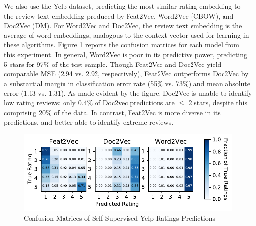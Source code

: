 \documentclass{article}
\begin{document}
We also use the Yelp dataset, predicting the most similar rating embedding to the review text embedding produced by Feat2Vec, Word2Vec (CBOW), and Doc2Vec (DM).
For Word2Vec and Doc2Vec, the review text embedding is the average of word embeddings, analogous to the context vector used for learning in these algorithms. Figure \ref{fig:confmat} reports the confusion matrices for each model from this experiment.
In general, Word2Vec is poor in its predictive power, predicting 5 stars for 97\% of the test sample. Though Feat2Vec and Doc2Vec yield comparable MSE (2.94 vs. 2.92, respectively), Feat2Vec outperforms Doc2Vec by a substantial margin in classification error rate (55\% vs. 73\%) and mean absolute error (1.13 vs. 1.31). As made evident by the figure, Doc2Vec is unable to identify low rating reviews: only 0.4\% of Doc2vec predictions are $\leq$ 2 stars, despite this comprising 20\% of the data. In contrast, Feat2Vec is more diverse in its predictions, and better able to identify extreme reviews.

\begin{figure}
\includegraphics[width=.5\textwidth]{../paper/output/yelp/text_rating_confusionmat_numbers}
\caption{Confusion Matrices of Self-Supervised Yelp Ratings Predictions}
\label{fig:confmat}
\end{figure}
\end{document}
